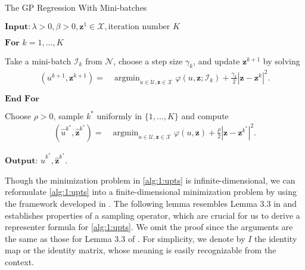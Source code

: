 \documentclass[10pt,reqno]{amsart}
\newcommand{\argmin}{\operatorname{argmin}}
\newcommand{\1}{{\chi}}
\numberwithin{equation}{section}
\theoremstyle{thmlemcorr}
\numberwithin{theorem}{section}
\theoremstyle{thmlemcorr*}
\theoremstyle{defi}
\theoremstyle{remexample}
\theoremstyle{ass}
\begin{document}
\begin{algorithm}
	\caption{The GP Regression With Mini-batches}\label{alg:1}
	$\textbf{Input}: \lambda>0, \beta>0, \boldsymbol{z}^1\in \mathcal{X}, \text{iteration number $K$}$
	
	$\textbf{For } k = 1,\dots,K$
	
	Take a mini-batch $\mathcal{I}_k$ from $\mathcal{N}$, choose a step size $\gamma_k$, and update $\boldsymbol{z}^{k+1}$ by solving 
	\begin{align}
		(u^{k+1}, \boldsymbol{z}^{k+1}) =& \argmin_{u\in \mathcal{U}, \boldsymbol{z}\in \mathcal{X}} \varphi(u, \boldsymbol{z}; \mathcal{I}_k) + \frac{\gamma_k}{2}|\boldsymbol{z} - \boldsymbol{z}^k|^2. \label{alg:1:upts}
	\end{align}
	
	$\textbf{End For}$
	
	Choose $\rho>0$, sample $k^*$ uniformly in $\{1, \dots, K\}$ and compute
	\begin{align}
		(\hat{u}^{k^*}, \hat{\boldsymbol{z}}^{k^*}) =& \argmin_{u\in \mathcal{U}, \boldsymbol{z}\in \mathcal{X}} \varphi(u, \boldsymbol{z}) + \frac{\rho}{2}|\boldsymbol{z} - \boldsymbol{z}^{k^*}|^2. \label{alg:1:fnop}
	\end{align}
	
	$\textbf{Output: } \hat{u}^{k^*}, \hat{\boldsymbol{z}}^{k^*}$. 
	
\end{algorithm}
Though the minimization problem in  \eqref{alg:1:upts} is infinite-dimensional,  we can reformulate \eqref{alg:1:upts} into a finite-dimensional minimization problem by using the framework developed in \cite{smale2005shannon}. The following lemma resembles Lemma 3.3 in \cite{meng2022sparse} and establishes properties of a sampling operator, which are crucial for us to derive a representer formula for \eqref{alg:1:upts}. 
We omit the proof since the arguments are the same as those for Lemma 3.3 of \cite{meng2022sparse}. For simplicity, we denote by $I$ the identity map or the identity matrix, whose meaning is easily recognizable from the context. 
\end{document}
